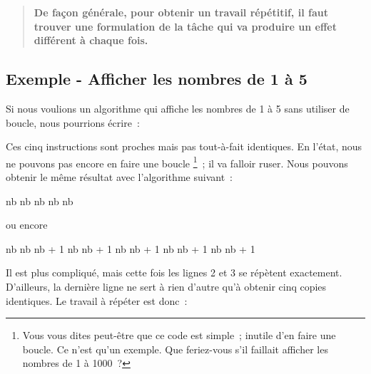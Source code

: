 	\begin{quote}
		\bfseries
		De façon générale,
		pour obtenir un travail répétitif,
		il faut trouver une formulation de la tâche
		qui va produire un effet différent à chaque fois.
	\end{quote}
	
	\subsection{Exemple - Afficher les nombres de 1 à 5}
	
		Si nous voulions un algorithme qui affiche les nombres de 1 à 5
		sans utiliser de boucle, nous pourrions écrire~:
		
		\begin{pseudocode}
		\end{pseudocode}
		
		Ces cinq instructions sont proches mais pas tout-à-fait identiques. 
		En l’état, nous ne pouvons pas encore en faire une boucle%
		\footnote{%
			Vous vous dites peut-être que ce code est simple~;
			inutile d’en faire une boucle.
			Ce n’est qu’un exemple.
			Que feriez-vous s’il faillait afficher les nombres
			de 1 à 1000~?
		}~;
		il va falloir ruser.
		Nous pouvons obtenir le même résultat avec l’algorithme suivant~:

		\begin{minipage}{5cm}
		\begin{pseudocode}
		\Let nb \Gets 1
		\Write{nb}
		\Let nb \Gets 2
		\Write{nb}
		\Let nb \Gets 3
		\Write{nb}
		\Let nb \Gets 4
		\Write{nb}
		\Let nb \Gets 5
		\Write{nb}
		\end{pseudocode}
		\end{minipage}
		\quad ou encore \quad
		\begin{minipage}{5cm}
		\begin{pseudocode}[1]
		\Let nb 
		\Let nb \Gets nb + 1
		\Let nb \Gets nb + 1
		\Let nb \Gets nb + 1
		\Let nb \Gets nb + 1
		\Let nb \Gets nb + 1
		\end{pseudocode}
		\end{minipage}
		
		Il est plus compliqué, mais cette fois les lignes 2 et 3 se répètent
		exactement.  D’ailleurs, la dernière ligne ne sert à rien d’autre qu’à
		obtenir cinq copies identiques.  Le travail à répéter est donc~:

